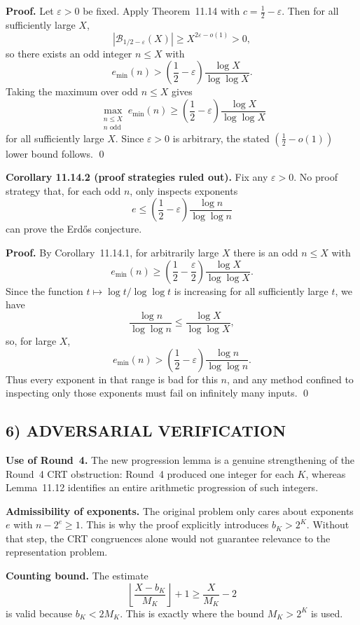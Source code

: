 \textbf{Proof.}
Let $\varepsilon>0$ be fixed. Apply Theorem~11.14 with $c=\tfrac12-\varepsilon$. Then for all sufficiently large $X$,
\[
 |\mathcal B_{1/2-\varepsilon}(X)|\ge X^{2\varepsilon-o(1)}>0,
\]
so there exists an odd integer $n\le X$ with
\[
 e_{\min}(n)>\left(\frac12-\varepsilon\right)\frac{\log X}{\log\log X}.
\]
Taking the maximum over odd $n\le X$ gives
\[
 \max_{\substack{n\le X\\ n\text{ odd}}} e_{\min}(n)
 \ge \left(\frac12-\varepsilon\right)\frac{\log X}{\log\log X}
\]
for all sufficiently large $X$. Since $\varepsilon>0$ is arbitrary, the stated $(\tfrac12-o(1))$ lower bound follows. \qed

\textbf{Corollary 11.14.2 (proof strategies ruled out).}
Fix any $\varepsilon>0$. No proof strategy that, for each odd $n$, only inspects exponents
\[
 e\le \left(\frac12-\varepsilon\right)\frac{\log n}{\log\log n}
\]
can prove the Erd\H{o}s conjecture.

\textbf{Proof.}
By Corollary~11.14.1, for arbitrarily large $X$ there is an odd $n\le X$ with
\[
 e_{\min}(n)\ge \left(\frac12-\frac\varepsilon2\right)\frac{\log X}{\log\log X}.
\]
Since the function $t\mapsto \log t/\log\log t$ is increasing for all sufficiently large $t$, we have
\[
 \frac{\log n}{\log\log n}\le \frac{\log X}{\log\log X},
\]
so, for large $X$,
\[
 e_{\min}(n)>\left(\frac12-\varepsilon\right)\frac{\log n}{\log\log n}.
\]
Thus every exponent in that range is bad for this $n$, and any method confined to inspecting only those exponents must fail on infinitely many inputs. \qed

\subsection{6) ADVERSARIAL VERIFICATION}
\textbf{Use of Round~4.} The new progression lemma is a genuine strengthening of the Round~4 CRT obstruction: Round~4 produced one integer for each $K$, whereas Lemma~11.12 identifies an entire arithmetic progression of such integers.

\textbf{Admissibility of exponents.} The original problem only cares about exponents $e$ with $n-2^e\ge 1$. This is why the proof explicitly introduces $b_K>2^K$. Without that step, the CRT congruences alone would not guarantee relevance to the representation problem.

\textbf{Counting bound.} The estimate
\[
 \left\lfloor\frac{X-b_K}{M_K}\right\rfloor+1\ge \frac{X}{M_K}-2
\]
is valid because $b_K<2M_K$. This is exactly where the bound $M_K>2^K$ is used.

